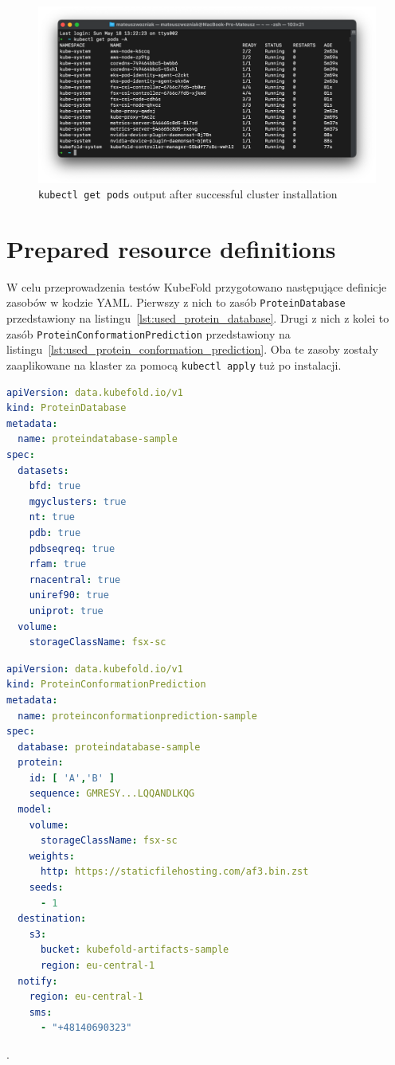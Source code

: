 \begin{figure}[htbp]
    \centering
    \includegraphics[width=\textwidth]{images/eks_pods_terminal}
    \caption{\texttt{kubectl get pods} output after successful cluster installation}
    \label{fig:eks_pods_terminal}
\end{figure}


\section{Prepared resource definitions}

W celu przeprowadzenia testów KubeFold przygotowano następujące definicje zasobów w kodzie YAML.
Pierwszy z nich to zasób \texttt{ProteinDatabase} przedstawiony na listingu~\ref{lst:used_protein_database}.
Drugi z nich z kolei to zasób \texttt{ProteinConformationPrediction} przedstawiony na listingu~\ref{lst:used_protein_conformation_prediction}.
Oba te zasoby zostały zaaplikowane na klaster za pomocą \texttt{kubectl apply} tuż po instalacji.

\begin{lstlisting}[language=yaml,caption={Used \texttt{ProteinDatabase} resource definition},label={lst:used_protein_database}]
apiVersion: data.kubefold.io/v1
kind: ProteinDatabase
metadata:
  name: proteindatabase-sample
spec:
  datasets:
    bfd: true
    mgyclusters: true
    nt: true
    pdb: true
    pdbseqreq: true
    rfam: true
    rnacentral: true
    uniref90: true
    uniprot: true
  volume:
    storageClassName: fsx-sc
\end{lstlisting}

\begin{lstlisting}[language=yaml,caption={Used \texttt{ProteinConformationPrediction} resource definition},label={lst:used_protein_conformation_prediction}]
apiVersion: data.kubefold.io/v1
kind: ProteinConformationPrediction
metadata:
  name: proteinconformationprediction-sample
spec:
  database: proteindatabase-sample
  protein:
    id: [ 'A','B' ]
    sequence: GMRESY...LQQANDLKQG
  model:
    volume:
      storageClassName: fsx-sc
    weights:
      http: https://staticfilehosting.com/af3.bin.zst
    seeds:
      - 1
  destination:
    s3:
      bucket: kubefold-artifacts-sample
      region: eu-central-1
  notify:
    region: eu-central-1
    sms:
      - "+48140690323"
\end{lstlisting}.

